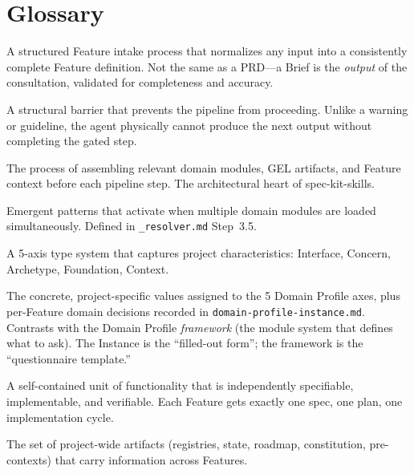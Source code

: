 \documentclass[11pt,a4paper,openright,twoside]{report}
\newcommand{\file}[1]{\texttt{#1}}
\begin{document}
\chapter{Glossary}
\label{app:glossary}

\begin{description}[style=nextline]
  \item[Brief] A structured Feature intake process that normalizes any input into a consistently complete Feature definition. Not the same as a PRD---a Brief is the \emph{output} of the consultation, validated for completeness and accuracy.

  \item[BLOCKING gate] A structural barrier that prevents the pipeline from proceeding. Unlike a warning or guideline, the agent physically cannot produce the next output without completing the gated step.

  \item[Context Injection] The process of assembling relevant domain modules, GEL artifacts, and Feature context before each pipeline step. The architectural heart of spec-kit-skills.

  \item[Cross-Concern Integration Rules] Emergent patterns that activate when multiple domain modules are loaded simultaneously. Defined in \file{\_resolver.md} Step~3.5.

  \item[Domain Profile] A 5-axis type system that captures project characteristics: Interface, Concern, Archetype, Foundation, Context.

  \item[Domain Profile Instance] The concrete, project-specific values assigned to the 5 Domain Profile axes, plus per-Feature domain decisions recorded in \file{domain-profile-instance.md}. Contrasts with the Domain Profile \emph{framework} (the module system that defines what to ask). The Instance is the ``filled-out form''; the framework is the ``questionnaire template.''

  \item[Feature] A self-contained unit of functionality that is independently specifiable, implementable, and verifiable. Each Feature gets exactly one spec, one plan, one implementation cycle.

  \item[GEL (Global Evolution Layer)] The set of project-wide artifacts (registries, state, roadmap, constitution, pre-contexts) that carry information across Features.


\end{description}
\end{document}
